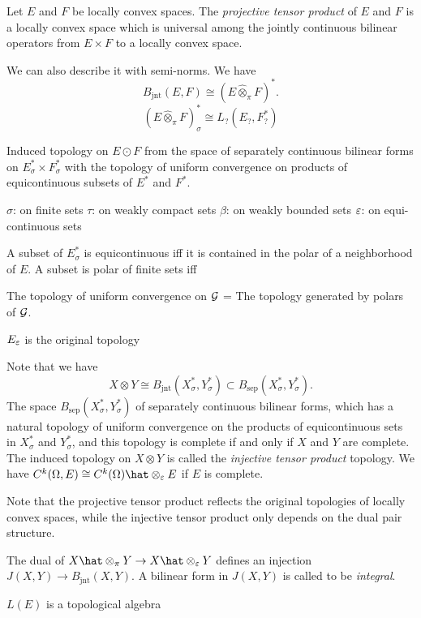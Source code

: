 \documentclass{../../large}
\begin{document}
\begin{prb}
Let $E$ and $F$ be locally convex spaces.
The \emph{projective tensor product} of $E$ and $F$ is a locally convex space which is universal among the jointly continuous bilinear operators from $E\times F$ to a locally convex space.

We can also describe it with semi-norms.
We have
\[B_{\mathrm{jnt}}(E,F)\cong(E\hat\otimes_\pi F)^*.\]
\[(E\hat\otimes_\pi F)^*_\sigma\cong L_?(E_?,F^*_?)\]



Induced topology on $E\odot F$ from the space of separately continuous bilinear forms on $E_\sigma^*\times F_\sigma^*$ with the topology of uniform convergence on products of equicontinuous subsets of $E^*$ and $F^*$.

$\sigma$: on finite sets
$\tau$: on weakly compact sets
$\beta$: on weakly bounded sets
$\varepsilon$: on equi-continuous sets


A subset of $E^*_\sigma$ is equicontinuous iff it is contained in the polar of a neighborhood of $E$.
A subset is polar of finite sets iff 

The topology of uniform convergence on $\mathcal{G}$ = The topology generated by polars of $\mathcal{G}$.

$E_\varepsilon$ is the original topology


Note that we have
\[X\otimes Y\cong B_{\mathrm{jnt}}(X_\sigma^*,Y_\sigma^*)\subset B_{\mathrm{sep}}(X_\sigma^*,Y_\sigma^*).\]
The space $B_{\mathrm{sep}}(X_\sigma^*,Y_\sigma^*)$ of separately continuous bilinear forms, which has a natural topology of uniform convergence on the products of equicontinuous sets in $X_\sigma^*$ and $Y_\sigma^*$, and this topology is complete if and only if $X$ and $Y$ are complete.
The induced topology on $X\otimes Y$ is called the \emph{injective tensor product} topology.
We have $C^k(\Omega,E)\cong C^k(\Omega)\hat\otimes_\e E$ if $E$ is complete.

Note that the projective tensor product reflects the original topologies of locally convex spaces, while the injective tensor product only depends on the dual pair structure.

The dual of $X\hat\otimes_\pi Y\to X\hat\otimes_\e Y$ defines an injection $J(X,Y)\to B_{\mathrm{jnt}}(X,Y)$.
A bilinear form in $J(X,Y)$ is called to be \emph{integral}.
\end{prb}


\begin{prb}
$L(E)$ is a topological algebra
\end{prb}
\end{document}
